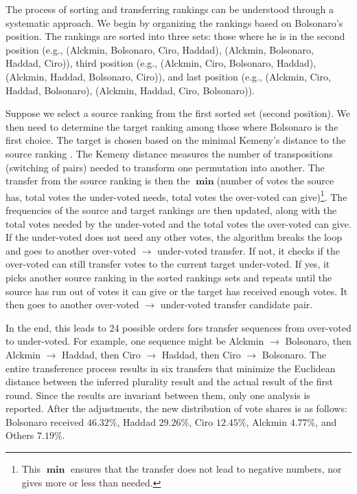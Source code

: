 \documentclass[hidelinks,11pt]{article} \usepackage[utf8]{inputenc}
\begin{document}


The process of sorting and transferring rankings can be understood through a
systematic approach. We begin by organizing the rankings based on Bolsonaro's
position. The rankings are sorted into three sets: those where he is in the
second position (e.g., (Alckmin, Bolsonaro, Ciro, Haddad), (Alckmin, Bolsonaro,
Haddad, Ciro)), third position (e.g., (Alckmin, Ciro, Bolsonaro, Haddad),
(Alckmin, Haddad, Bolsonaro, Ciro)), and last position (e.g., (Alckmin, Ciro,
Haddad, Bolsonaro), (Alckmin, Haddad, Ciro, Bolsonaro)).

Suppose we select a source ranking from the first sorted set (second position).
We then need to determine the target ranking among those where Bolsonaro is the
first choice. The target is chosen based on the minimal Kemeny's distance to the
source ranking \parencite{nurmi2002voting}. The Kemeny distance measures the
number of transpositions (switching of pairs) needed to transform one
permutation into another. The transfer from the source ranking is then the
\(\operatorname{\mathbf{min}}\)(number of votes the source has, total votes the
under-voted needs, total votes the over-voted can give)\footnote{This \(\operatorname{\mathbf{min}}\) ensures that the transfer does not lead to negative numbers, nor gives more or less than needed.}. The frequencies of
the source and target rankings are then updated, along with the total votes
needed by the under-voted and the total votes the over-voted can give. If the
under-voted does not need any other votes, the algorithm breaks the loop and
goes to another over-voted \(\to\) under-voted transfer. If not, it checks if the
over-voted can still transfer votes to the current target under-voted. If yes,
it picks another source ranking in the sorted rankings sets and repeats until
the source has run out of votes it can give or the target has received enough
votes. It then goes to another over-voted \(\to\) under-voted transfer candidate
pair.

In the end, this leads to 24 possible orders fors transfer sequences from
over-voted to under-voted. For example, one sequence might be Alckmin \(\to\)
Bolsonaro, then Alckmin \(\to\) Haddad, then Ciro \(\to\) Haddad, then Ciro \(\to\)
Bolsonaro. The entire transference process results in six transfers that
minimize the Euclidean distance between the inferred plurality result and the
actual result of the first round. Since the results are invariant between them,
only one analysis is reported. After the adjustments, the new distribution of vote shares is as follows: Bolsonaro received \(46.32\%\), Haddad \(29.26\%\), Ciro \(12.45\%\), Alckmin \(4.77\%\), and Others \(7.19\%\).
\end{document}
